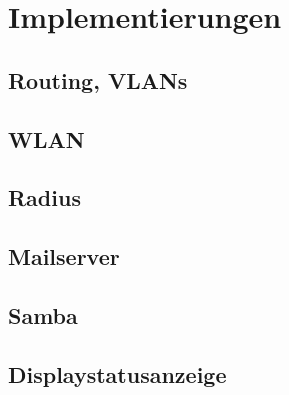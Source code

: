 \chapter{Implementierungen}

\section{Routing, VLANs}

\section{WLAN}

\section{Radius}

\section{Mailserver}

\section{Samba}

\section{Displaystatusanzeige}
